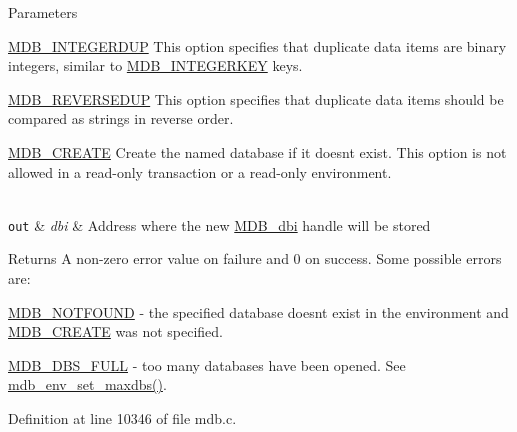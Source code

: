 \begin{DoxyParams}[1]{Parameters}
\begin{DoxyItemize}
\item \mbox{\hyperlink{group__mdb__dbi__open_gad9b1b4e231bf2e4fa8d7f90be8ba2765}{M\+D\+B\+\_\+\+I\+N\+T\+E\+G\+E\+R\+D\+UP}} This option specifies that duplicate data items are binary integers, similar to \mbox{\hyperlink{group__mdb__dbi__open_ga219c5c50d41902fca79c68d8836e7753}{M\+D\+B\+\_\+\+I\+N\+T\+E\+G\+E\+R\+K\+EY}} keys. 
\item \mbox{\hyperlink{group__mdb__dbi__open_gaf99ce592b75d65e23503f78a7933c297}{M\+D\+B\+\_\+\+R\+E\+V\+E\+R\+S\+E\+D\+UP}} This option specifies that duplicate data items should be compared as strings in reverse order. 
\item \mbox{\hyperlink{group__mdb__dbi__open_gafd47620cff55fb3ec7cd7501d4d1cb4a}{M\+D\+B\+\_\+\+C\+R\+E\+A\+TE}} Create the named database if it doesn\textquotesingle{}t exist. This option is not allowed in a read-\/only transaction or a read-\/only environment. 
\end{DoxyItemize}\\
\hline
\mbox{\tt out}  & {\em dbi} & Address where the new \mbox{\hyperlink{group__mdb_gadbe68a06c448dfb62da16443d251a78b}{M\+D\+B\+\_\+dbi}} handle will be stored \\
\hline
\end{DoxyParams}
\begin{DoxyReturn}{Returns}
A non-\/zero error value on failure and 0 on success. Some possible errors are\+: 
\begin{DoxyItemize}
\item \mbox{\hyperlink{group__errors_gabeb52e4c4be21b329e31c4add1b71926}{M\+D\+B\+\_\+\+N\+O\+T\+F\+O\+U\+ND}} -\/ the specified database doesn\textquotesingle{}t exist in the environment and \mbox{\hyperlink{group__mdb__dbi__open_gafd47620cff55fb3ec7cd7501d4d1cb4a}{M\+D\+B\+\_\+\+C\+R\+E\+A\+TE}} was not specified. 
\item \mbox{\hyperlink{group__errors_ga6288de36b58badda2e5a64ecddd1da70}{M\+D\+B\+\_\+\+D\+B\+S\+\_\+\+F\+U\+LL}} -\/ too many databases have been opened. See \mbox{\hyperlink{group__mdb_gaa2fc2f1f37cb1115e733b62cab2fcdbc}{mdb\+\_\+env\+\_\+set\+\_\+maxdbs()}}. 
\end{DoxyItemize}
\end{DoxyReturn}


Definition at line 10346 of file mdb.\+c.

\mbox{\label{group__mdb_gac61d3087282b0824c8c5caff6caabdf3}} 

